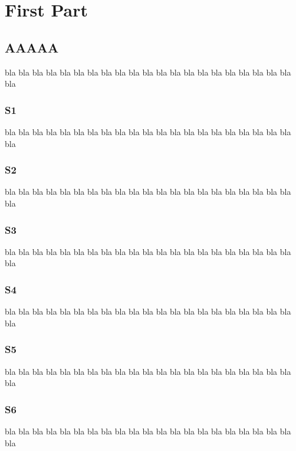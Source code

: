 \documentclass[12pt,a4paper]{book}
\begin{document}
\dominitoc
\dominilof[c]                   %
\dominilot
\doparttoc                      %
\dopartlof                      %
\dopartlot                      %
\faketableofcontents            %
\fakelistoffigures              %
\fakelistoftables
\part{First Part}
\parttoc
\partlof[r]
\partlot[r]
\twocolumn                      %
\chapter{AAAAA}                 %
\minitoc[r]                     %
bla bla bla bla bla bla bla bla bla bla bla
bla bla bla bla bla bla bla bla bla bla bla
\section{S1}
bla bla bla bla bla bla bla bla bla bla bla
bla bla bla bla bla bla bla bla bla bla bla
\section{S2}
bla bla bla bla bla bla bla bla bla bla bla
bla bla bla bla bla bla bla bla bla bla bla
\section{S3}
bla bla bla bla bla bla bla bla bla bla bla
bla bla bla bla bla bla bla bla bla bla bla
\section{S4}
bla bla bla bla bla bla bla bla bla bla bla
bla bla bla bla bla bla bla bla bla bla bla
\section{S5}
bla bla bla bla bla bla bla bla bla bla bla
bla bla bla bla bla bla bla bla bla bla bla
\section{S6}
bla bla bla bla bla bla bla bla bla bla bla
bla bla bla bla bla bla bla bla bla bla bla
\end{document}
